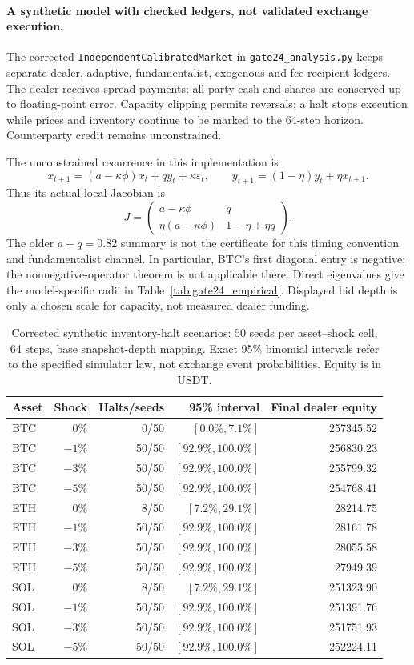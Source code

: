 \documentclass[10pt,twocolumn,letterpaper]{article}
\theoremstyle{definition}
\theoremstyle{remark}
\begin{document}
\paragraph{A synthetic model with checked ledgers, not validated exchange execution.}
The corrected \texttt{IndependentCalibratedMarket} in \texttt{gate24\_analysis.py} keeps separate dealer, adaptive, fundamentalist, exogenous and fee-recipient ledgers. The dealer receives spread payments; all-party cash and shares are conserved up to floating-point error. Capacity clipping permits reversals; a halt stops execution while prices and inventory continue to be marked to the 64-step horizon. Counterparty credit remains unconstrained.

The unconstrained recurrence in this implementation is
\[
x_{t+1}=(a-\kappa\phi)x_t+qy_t+\kappa\varepsilon_t,\qquad
y_{t+1}=(1-\eta)y_t+\eta x_{t+1}.
\]
Thus its actual local Jacobian is
\[
J=\begin{pmatrix}a-\kappa\phi&q\\
\eta(a-\kappa\phi)&1-\eta+\eta q\end{pmatrix}.
\]
The older $a+q=0.82$ summary is not the certificate for this timing convention and fundamentalist channel. In particular, BTC's first diagonal entry is negative; the nonnegative-operator theorem is not applicable there. Direct eigenvalues give the model-specific radii in Table~\ref{tab:gate24_empirical}. Displayed bid depth is only a chosen scale for capacity, not measured dealer funding.
\begin{table}[htbp]\centering\small
\caption{Corrected synthetic inventory-halt scenarios: 50 seeds per asset--shock cell, 64 steps, base snapshot-depth mapping. Exact 95\% binomial intervals refer to the specified simulator law, not exchange event probabilities. Equity is in USDT.}
\label{tab:gate4_shock_ci}
\begin{tabular}{lrrrr}\toprule
Asset & Shock & Halts/seeds & 95\% interval & Final dealer equity\\\midrule
BTC & $0\%$ & 0/50 & $[0.0\%,7.1\%]$ & 257345.52 \\
BTC & $-1\%$ & 50/50 & $[92.9\%,100.0\%]$ & 256830.23 \\
BTC & $-3\%$ & 50/50 & $[92.9\%,100.0\%]$ & 255799.32 \\
BTC & $-5\%$ & 50/50 & $[92.9\%,100.0\%]$ & 254768.41 \\
ETH & $0\%$ & 8/50 & $[7.2\%,29.1\%]$ & 28214.75 \\
ETH & $-1\%$ & 50/50 & $[92.9\%,100.0\%]$ & 28161.78 \\
ETH & $-3\%$ & 50/50 & $[92.9\%,100.0\%]$ & 28055.58 \\
ETH & $-5\%$ & 50/50 & $[92.9\%,100.0\%]$ & 27949.39 \\
SOL & $0\%$ & 8/50 & $[7.2\%,29.1\%]$ & 251323.90 \\
SOL & $-1\%$ & 50/50 & $[92.9\%,100.0\%]$ & 251391.76 \\
SOL & $-3\%$ & 50/50 & $[92.9\%,100.0\%]$ & 251751.93 \\
SOL & $-5\%$ & 50/50 & $[92.9\%,100.0\%]$ & 252224.11 \\
\bottomrule\end{tabular}\end{table}
\end{document}
